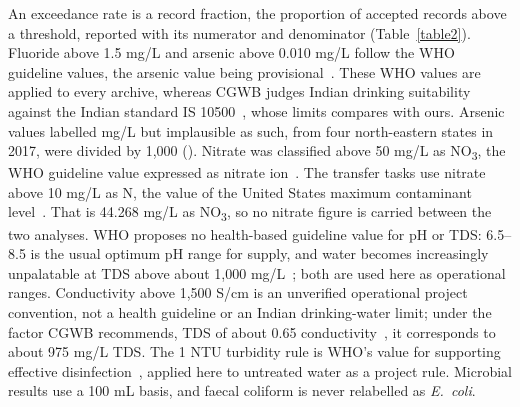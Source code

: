 \documentclass[10pt,letterpaper]{article}
\begin{document}
An exceedance rate is a record fraction, the proportion of accepted records above a threshold, reported with its numerator and denominator (Table~\ref{table2}). Fluoride above 1.5 mg/L and arsenic above 0.010 mg/L follow the WHO guideline values, the arsenic value being provisional~\cite{WHO2022GDWQ}. These WHO values are applied to every archive, whereas CGWB judges Indian drinking suitability against the Indian standard IS 10500~\cite{CGWB-AGWQR2025}, whose limits  compares with ours. Arsenic values labelled mg/L but implausible as such, from four north-eastern states in 2017, were divided by 1,000 (). Nitrate was classified above 50 mg/L as NO\textsubscript{3}, the WHO guideline value expressed as nitrate ion~\cite{WHO2022GDWQ}. The transfer tasks use nitrate above 10 mg/L as N, the value of the United States maximum contaminant level~\cite{USEPA-NPDWR}. That is 44.268 mg/L as NO\textsubscript{3}, so no nitrate figure is carried between the two analyses. WHO proposes no health-based guideline value for pH or TDS: 6.5--8.5 is the usual optimum pH range for supply, and water becomes increasingly unpalatable at TDS above about 1,000 mg/L~\cite{WHO2022GDWQ}; both are used here as operational ranges. Conductivity above 1,500 \textmu{}S/cm is an unverified operational project convention, not a health guideline or an Indian drinking-water limit; under the factor CGWB recommends, TDS of about 0.65 \texttimes{} conductivity~\cite{CGWB-SOP-GWQDataAnalysis}, it corresponds to about 975 mg/L TDS. The 1 NTU turbidity rule is WHO's value for supporting effective disinfection~\cite{WHO2022GDWQ}, applied here to untreated water as a project rule. Microbial results use a 100 mL basis, and faecal coliform is never relabelled as \textit{E.~coli}.
\end{document}
